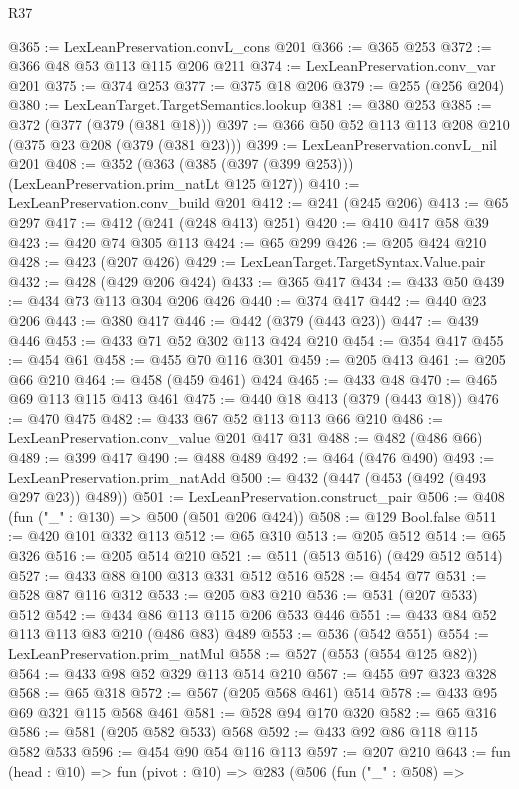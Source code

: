 \begin{lexlean}{R37}
\begin{coremodule}
@365 := LexLeanPreservation.convL_cons @201
@366 := @365 @253
@372 := @366 @48 @53 @113 @115 @206 @211
@374 := LexLeanPreservation.conv_var @201
@375 := @374 @253
@377 := @375 @18 @206
@379 := @255 (@256 @204)
@380 := LexLeanTarget.TargetSemantics.lookup
@381 := @380 @253
@385 := @372 (@377 (@379 (@381 @18)))
@397 := @366 @50 @52 @113 @113 @208 @210 (@375 @23 @208 (@379 (@381 @23)))
@399 := LexLeanPreservation.convL_nil @201
@408 := @352 (@363 (@385 (@397 (@399 @253))) (LexLeanPreservation.prim_natLt @125 @127))
@410 := LexLeanPreservation.conv_build @201
@412 := @241 (@245 @206)
@413 := @65 @297
@417 := @412 (@241 (@248 @413) @251)
@420 := @410 @417 @58 @39
@423 := @420 @74 @305 @113
@424 := @65 @299
@426 := @205 @424 @210
@428 := @423 (@207 @426)
@429 := LexLeanTarget.TargetSyntax.Value.pair
@432 := @428 (@429 @206 @424)
@433 := @365 @417
@434 := @433 @50
@439 := @434 @73 @113 @304 @206 @426
@440 := @374 @417
@442 := @440 @23 @206
@443 := @380 @417
@446 := @442 (@379 (@443 @23))
@447 := @439 @446
@453 := @433 @71 @52 @302 @113 @424 @210
@454 := @354 @417
@455 := @454 @61
@458 := @455 @70 @116 @301
@459 := @205 @413
@461 := @205 @66 @210
@464 := @458 (@459 @461) @424
@465 := @433 @48
@470 := @465 @69 @113 @115 @413 @461
@475 := @440 @18 @413 (@379 (@443 @18))
@476 := @470 @475
@482 := @433 @67 @52 @113 @113 @66 @210
@486 := LexLeanPreservation.conv_value @201 @417 @31
@488 := @482 (@486 @66)
@489 := @399 @417
@490 := @488 @489
@492 := @464 (@476 @490)
@493 := LexLeanPreservation.prim_natAdd
@500 := @432 (@447 (@453 (@492 (@493 @297 @23)) @489))
@501 := LexLeanPreservation.construct_pair
@506 := @408 (fun ("_" : @130) => @500 (@501 @206 @424))
@508 := @129 Bool.false
@511 := @420 @101 @332 @113
@512 := @65 @310
@513 := @205 @512
@514 := @65 @326
@516 := @205 @514 @210
@521 := @511 (@513 @516) (@429 @512 @514)
@527 := @433 @88 @100 @313 @331 @512 @516
@528 := @454 @77
@531 := @528 @87 @116 @312
@533 := @205 @83 @210
@536 := @531 (@207 @533) @512
@542 := @434 @86 @113 @115 @206 @533 @446
@551 := @433 @84 @52 @113 @113 @83 @210 (@486 @83) @489
@553 := @536 (@542 @551)
@554 := LexLeanPreservation.prim_natMul
@558 := @527 (@553 (@554 @125 @82))
@564 := @433 @98 @52 @329 @113 @514 @210
@567 := @455 @97 @323 @328
@568 := @65 @318
@572 := @567 (@205 @568 @461) @514
@578 := @433 @95 @69 @321 @115 @568 @461
@581 := @528 @94 @170 @320
@582 := @65 @316
@586 := @581 (@205 @582 @533) @568
@592 := @433 @92 @86 @118 @115 @582 @533
@596 := @454 @90 @54 @116 @113
@597 := @207 @210
@643 := fun (head : @10) =>
  fun (pivot : @10) =>
  @283
    (@506
      (fun ("_" : @508) =>

\end{coremodule}
\end{lexlean}
